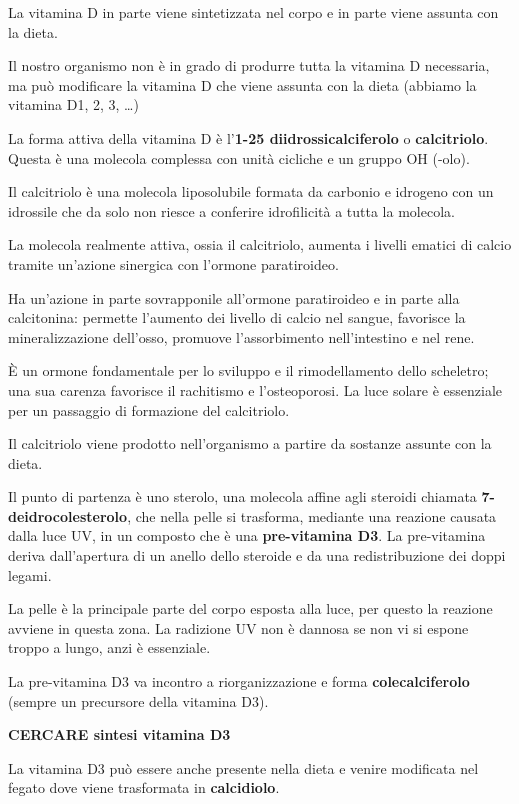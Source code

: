 \documentclass[]{article}
\begin{document}
La vitamina D in parte viene sintetizzata nel corpo e in parte viene
assunta con la dieta.

Il nostro organismo non è in grado di produrre tutta la vitamina D
necessaria, ma può modificare la vitamina D che viene assunta con la
dieta (abbiamo la vitamina D1, 2, 3, \ldots{})

La forma attiva della vitamina D è l'\textbf{1-25 diidrossicalciferolo}
o \textbf{calcitriolo}. Questa è una molecola complessa con unità
cicliche e un gruppo OH (-olo).

Il calcitriolo è una molecola liposolubile formata da carbonio e
idrogeno con un idrossile che da solo non riesce a conferire
idrofilicità a tutta la molecola.

La molecola realmente attiva, ossia il calcitriolo, aumenta i livelli
ematici di calcio tramite un'azione sinergica con l'ormone paratiroideo.

Ha un'azione in parte sovrapponile all'ormone paratiroideo e in parte
alla calcitonina: permette l'aumento dei livello di calcio nel sangue,
favorisce la mineralizzazione dell'osso, promuove l'assorbimento
nell'intestino e nel rene.

È un ormone fondamentale per lo sviluppo e il rimodellamento dello
scheletro; una sua carenza favorisce il rachitismo e l'osteoporosi. La
luce solare è essenziale per un passaggio di formazione del calcitriolo.

Il calcitriolo viene prodotto nell'organismo a partire da sostanze
assunte con la dieta.

Il punto di partenza è uno sterolo, una molecola affine agli steroidi
chiamata \textbf{7-deidrocolesterolo}, che nella pelle si trasforma,
mediante una reazione causata dalla luce UV, in un composto che è una
\textbf{pre-vitamina D3}. La pre-vitamina deriva dall'apertura di un
anello dello steroide e da una redistribuzione dei doppi legami.

La pelle è la principale parte del corpo esposta alla luce, per questo
la reazione avviene in questa zona. La radizione UV non è dannosa se non
vi si espone troppo a lungo, anzi è essenziale.

La pre-vitamina D3 va incontro a riorganizzazione e forma
\textbf{colecalciferolo} (sempre un precursore della vitamina D3).

\textbf{CERCARE sintesi vitamina D3}

La vitamina D3 può essere anche presente nella dieta e venire modificata
nel fegato dove viene trasformata in \textbf{calcidiolo}.
\end{document}
